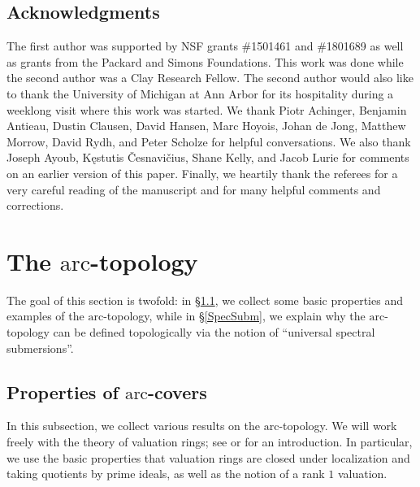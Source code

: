 \documentclass[reqno]{amsart}
\newcommand{\arc}{\mathrm{arc}}
\theoremstyle{definition}
\begin{document}
\subsection*{Acknowledgments} 
The first author was supported by NSF grants \#1501461 and \#1801689 as well as grants from the Packard and Simons Foundations. This work was done while the second author was a
Clay Research Fellow. The second author would also like to thank the University of Michigan
at Ann Arbor for its hospitality during a weeklong visit where this work was
started. We thank Piotr Achinger, Benjamin Antieau, Dustin Clausen, David
Hansen, Marc Hoyois, Johan de Jong,
Matthew Morrow, David Rydh, and Peter Scholze for helpful conversations. We also
thank Joseph Ayoub, K\k{e}stutis \v{C}esnavi\v{c}ius, Shane Kelly, and Jacob
Lurie for comments on an earlier version of this
paper. 
Finally, we heartily thank the referees for a very careful reading of the
manuscript and for many helpful comments and
corrections. 

\newpage
\section{The $\arc$-topology}

The goal of this section is twofold: in \S \ref{ArcProperties}, we collect some basic properties and examples of the $\arc$-topology, while in \S \ref{SpecSubm}, we explain why the $\arc$-topology can be defined topologically via the notion of ``universal spectral submersions''. 

\subsection{Properties of $\arc$-covers}
\label{ArcProperties}

In this subsection, we collect various results on the $\arc$-topology. We will work freely with the theory of valuation rings; see  \cite[Tag 0018, Tag 0ASF]{stacks-project} or \cite[Ch. 6]{BourbakiCA} for an introduction. In particular, we use the basic properties that valuation rings are closed under localization and taking quotients by prime ideals, as well as the notion of a rank $1$ valuation. 
\end{document}
